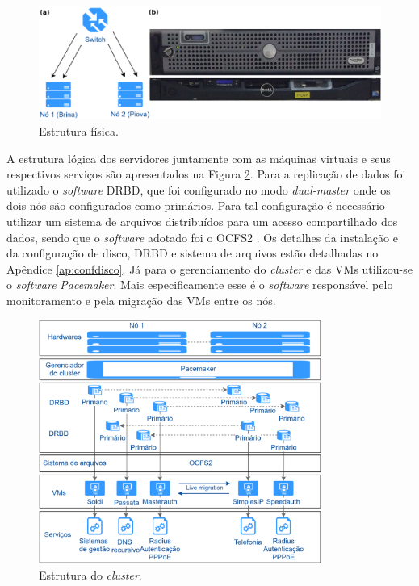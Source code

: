 \begin{figure}[h!]
 \centering
 \includegraphics[width=450px]{img/projeto_fisico.eps}
 \caption{Estrutura física.}
 \label{fig:projeto_fisico}
\end{figure}

A estrutura lógica dos servidores juntamente com as máquinas virtuais e seus respectivos serviços são apresentados na Figura 
\ref{fig:projeto_estrutura}. Para a replicação de dados foi utilizado o \textit{software} \ac{DRBD}, que foi configurado no modo 
\textit{dual-master} onde os dois nós são configurados como primários. Para tal configuração é necessário utilizar um sistema de arquivos 
distribuídos para um acesso compartilhado dos dados, sendo que o \textit{software} adotado foi o \ac{OCFS2} \cite{ocfs2}. 
Os detalhes da instalação e da configuração de disco, \ac{DRBD} e sistema de arquivos estão detalhadas no Apêndice \ref{ap:confdisco}. 
Já para o gerenciamento do \textit{cluster} e das \acp{VM} utilizou-se o \textit{software} \textit{Pacemaker}. 
Mais especificamente esse é o \textit{software} responsável pelo monitoramento e pela migração das \acp{VM} entre os nós.

\begin{figure}[h!]
 \centering
 \includegraphics[width=350px]{img/projeto_estrutura.eps}
 \caption{Estrutura do \textit{cluster}.}
 \label{fig:projeto_estrutura}
\end{figure}

